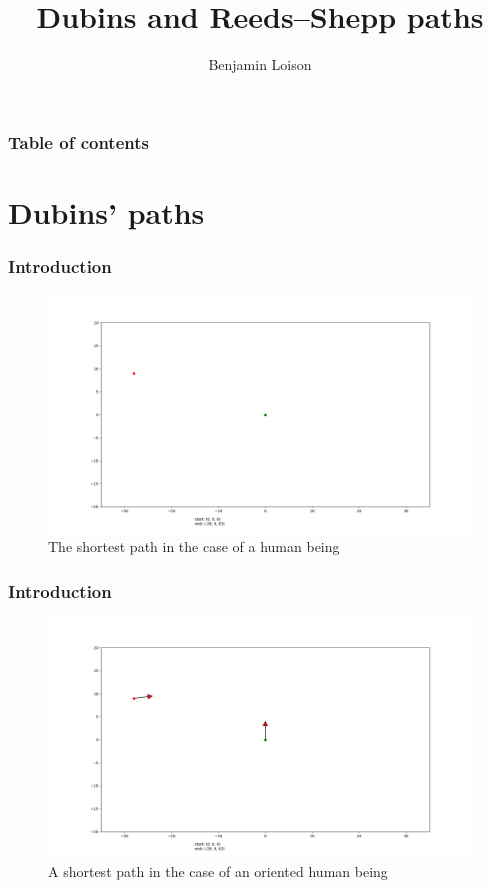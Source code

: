 \documentclass{beamer}
\title{Dubins and Reeds–Shepp paths}
\date{}%
\author{Benjamin Loison}
\begin{document}
\frame{\titlepage}

\begin{frame}
\frametitle{Table of contents}
\tableofcontents
\end{frame}

\section{Dubins' paths}

\begin{frame}

\frametitle{Introduction}

\begin{figure}
\centering
  \centering
  \includegraphics[width=1.1\linewidth]{Illustrations/human.png}
  \caption{The shortest path in the case of a human being}
  \label{fig:sub1}
\end{figure}
\end{frame}

\begin{frame}

\frametitle{Introduction}

\begin{figure}
\centering
  \centering
  \includegraphics[width=1.1\linewidth]{Illustrations/humanOriented.png}
  \caption{A shortest path in the case of an oriented human being}
  \label{fig:sub1}
\end{figure}
\end{frame}
\end{document}
